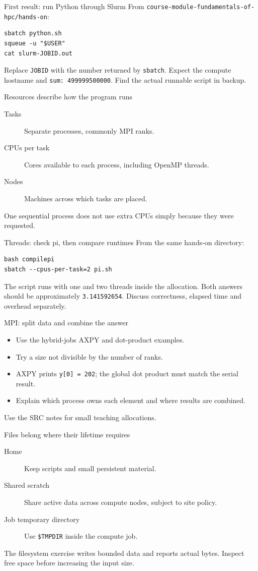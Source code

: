\documentclass[aspectratio=169,11pt]{beamer}
\begin{document}
\begin{frame}[fragile]{First result: run Python through Slurm}
From \texttt{course-module-fundamentals-of-hpc/hands-on}:
\begin{verbatim}
sbatch python.sh
squeue -u "$USER"
cat slurm-JOBID.out
\end{verbatim}
Replace \texttt{JOBID} with the number returned by \texttt{sbatch}.
Expect the compute hostname and \texttt{sum: 499999500000}.
Find the actual runnable script in backup.
\end{frame}
\begin{frame}{Resources describe how the program runs}
\begin{description}
\item[Tasks] Separate processes, commonly MPI ranks.
\item[CPUs per task] Cores available to each process, including OpenMP threads.
\item[Nodes] Machines across which tasks are placed.
\end{description}
One sequential process does not use extra CPUs simply because they were requested.
\end{frame}
\begin{frame}[fragile]{Threads: check pi, then compare runtimes}
From the same hands-on directory:
\begin{verbatim}
bash compilepi
sbatch --cpus-per-task=2 pi.sh
\end{verbatim}
The script runs with one and two threads inside the allocation.
Both answers should be approximately \texttt{3.141592654}.
Discuss correctness, elapsed time and overhead separately.
\end{frame}
\begin{frame}{MPI: split data and combine the answer}
\begin{itemize}
\item Use the hybrid-jobs AXPY and dot-product examples.
\item Try a size not divisible by the number of ranks.
\item AXPY prints \texttt{y[0] = 202}; the global dot product must match the serial result.
\item Explain which process owns each element and where results are combined.
\end{itemize}
Use the SRC notes for small teaching allocations.
\end{frame}
\begin{frame}{Files belong where their lifetime requires}
\begin{description}
\item[Home] Keep scripts and small persistent material.
\item[Shared scratch] Share active data across compute nodes, subject to site policy.
\item[Job temporary directory] Use \texttt{\$TMPDIR} inside the compute job.
\end{description}
The filesystem exercise writes bounded data and reports actual bytes.
Inspect free space before increasing the input size.
\end{frame}
\end{document}
